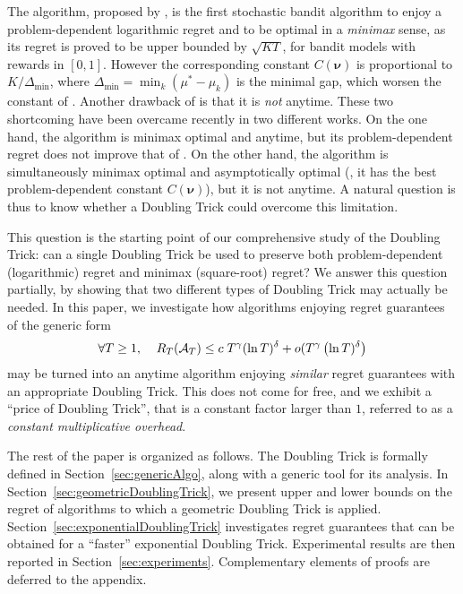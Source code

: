 \documentclass[12pt]{colt2018} %
\begin{document}
The \MOSS{} algorithm, proposed by \cite{Audibert2009minimax}, is the first stochastic bandit algorithm
to enjoy a problem-dependent logarithmic regret
and to be optimal in a \emph{minimax} sense, as its regret is proved to be upper bounded by $\sqrt{KT}$, for bandit models with rewards in $[0,1]$.
However the corresponding constant $C(\bm \nu)$ is proportional to $K/\Delta_{\min}$, where $\Delta_{\min} = \min_{k} (\mu^*-\mu_k)$ is the minimal gap, which worsen the constant of \UCBone{}.
Another drawback of \MOSS{} is that it is \emph{not} anytime.
%
These two shortcoming have been overcame recently in two different works.
On the one hand, the \MOSSAnytime{} algorithm \citep{Degenne16} is minimax optimal and anytime, but its problem-dependent regret does not improve that of \MOSS.
On the other hand, the \KLUCBpp{} algorithm \citep{Menard17} is simultaneously minimax optimal and asymptotically optimal (\ie, it has the best problem-dependent constant $C(\bm\nu)$), but it is not anytime. A natural question is thus to know whether a Doubling Trick could overcome this limitation.


This question is the starting point of our comprehensive study of the Doubling Trick: can a single Doubling Trick be used to preserve both problem-dependent (logarithmic) regret and minimax (square-root) regret?
We answer this question partially, by showing that two different types of Doubling Trick may actually be needed.
In this paper, we investigate how algorithms enjoying regret guarantees of the generic form
\begin{equation}\label{eq:genericWithLogT}
    \forall T \geq 1,\;\;\;\; R_T(\mathcal{A}_T) \leq c \; T^{\gamma} (\ln T)^{\delta} + o( T^{\gamma} \left(\ln T)^{\delta} \right)
\end{equation}
may be turned into an anytime algorithm enjoying \emph{similar} regret guarantees with an appropriate Doubling Trick.
%
This does not come for free, and we exhibit a ``price of Doubling Trick'', that is a constant factor larger than $1$, referred to as a \emph{constant multiplicative overhead}.



The rest of the paper is organized as follows.
The Doubling Trick is formally defined in Section~\ref{sec:genericAlgo}, along with a generic tool for its analysis.
In Section~\ref{sec:geometricDoublingTrick}, we present upper and lower bounds on the regret of algorithms to which a geometric Doubling Trick is applied.
Section~\ref{sec:exponentialDoublingTrick} investigates regret guarantees that can be obtained for a ``faster'' exponential Doubling Trick.
Experimental results are then reported in Section~\ref{sec:experiments}.
Complementary elements of proofs are deferred to the appendix.
\end{document}
